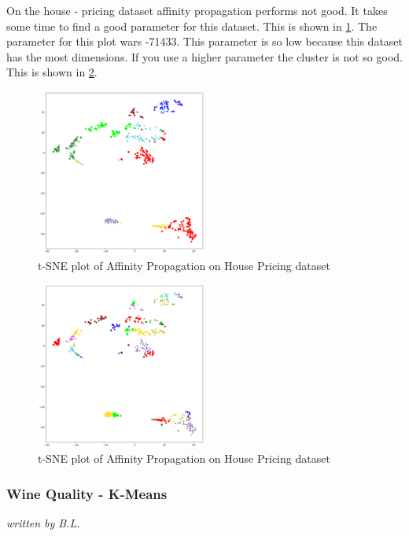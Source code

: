 On the house - pricing dataset affinity propagation performs not good. It takes some time to find a good parameter for this dataset. This is shown in  \ref{fig:af_house1}. The parameter for this plot wars -71433. This parameter is so low because this dataset has the most dimensions. If you use a higher parameter the cluster is not so good. This is shown in \ref{fig:afhouse2}.   

\begin{figure}[H]
		\begin{center}
			\includegraphics[width=0.5\textwidth]{images/af_housepricing71433.png}
			\caption{t-SNE plot of Affinity Propagation on House Pricing dataset}
		\end{center}
		\label{fig:af_house1}
	\end{figure}
	
	\begin{figure}[H]
			\begin{center}
				\includegraphics[width=0.5\textwidth]{images/af_housepricing6900.png}
				\caption{t-SNE plot of Affinity Propagation on House Pricing dataset}
			\end{center}
			\label{fig:afhouse2}
		\end{figure}

\subsubsection{Wine Quality - K-Means}
\textit{written by B.L.}\\

